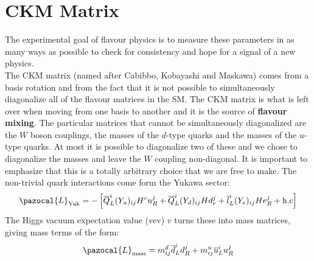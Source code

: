 \documentclass[../main.tex]{subfiles}
\begin{document}
\section{CKM Matrix}
The experimental goal of flavour physics is to measure these parameters in as many ways as possible to check for consistency and hope for a signal of a new physics.\\
The CKM matrix (named after Cabibbo, Kobayashi and Maskawa) comes from a basis rotation and from the fact that it is not possible to simultaneously diagonalize all of the flavour matrices in the SM. The CKM matrix is what is left over when moving from one basis to another and it is the source of \textbf{flavour mixing}. The
particular matrices that cannot be simultaneously diagonalized are the $W$ boson couplings, the masses of the $d$-type quarks and the masses of the $u$-type quarks. At most it is possible to diagonalize two of these and we chose to diagonalize the masses and leave the $W$ coupling non-diagonal. It is
important to emphasize that this is a totally arbitrary choice that we are free to make. The non-trivial quark interactions come form the Yukawa sector:
\[
\pazocal{L}_{\text{Yuk}}=-\left[\overline{Q}_L^i(Y_u)_{ij}H^cu_R^j+\overline{Q}_L^i(Y_d)_{ij}Hd_r^j+\overline{l}_L^i(Y_e)_{ij}He_R^j+\text{h.c}\right]
\]
The Higgs vacuum expectation value (vev) $v$ turns these into mass matrices, giving mass terms of the form:
\[
\pazocal{L}_{\text{mass}}=m_{ij}^d\overline{d}_L^id_R^j+m_{ij}^u\overline{u}_L^iu_R^j
\]
\end{document}
